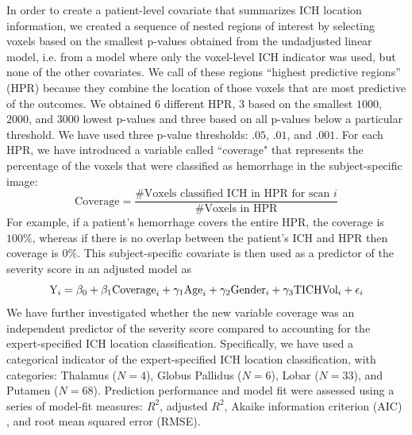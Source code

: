 \documentclass[10pt]{article}\usepackage[]{graphicx}\usepackage[]{color}
\begin{document}
In order to create a patient-level covariate that summarizes ICH location information, we created a sequence of nested regions of interest by selecting voxels based on the smallest p-values obtained from the undadjusted linear model, i.e. from a model where only the voxel-level ICH indicator was used, but none of the other covariates.  We call of these regions ``highest predictive regions'' (HPR) because they combine the location of those voxels that are most predictive of the outcomes. 
We obtained 6 different HPR, $3$ based on the smallest $1000$, $2000$, and $3000$ lowest p-values and three based on all p-values below a particular threshold. We have used three p-value thresholds: $.05$, $.01$, and $.001$. For each HPR, we have introduced a variable called ``coverage" that represents the percentage of the voxels that were classified as hemorrhage in the subject-specific image: 
\begin{equation}
\text{Coverage} = \frac{\text{\# Voxels classified ICH in HPR for scan } i}{\text{\# Voxels in HPR}}
\end{equation}
For example, if a patient's hemorrhage covers the entire HPR, the coverage is $100\%$, whereas if there is no overlap between the patient's ICH and HPR then coverage is 0\%.  This subject-specific covariate is then used as a predictor of the severity score in an adjusted model as
$$
{\rm Y}_i = \beta_0 + \beta_1 {\rm Coverage}_i + \gamma_1{\rm Age}_i  +\gamma_2{\rm Gender}_i +\gamma_3{\rm TICHVol}_i + \epsilon_{i}
$$
We have further investigated whether the new variable coverage was an independent predictor of the severity score compared to accounting for the expert-specified ICH location classification. Specifically, we have used 
a categorical indicator of the expert-specified ICH location classification, with categories: Thalamus ($N = 4$), Globus Pallidus ($N = 6$), Lobar ($N = 33$), and Putamen ($N = 68$).  
Prediction performance and model fit were assessed using a series of model-fit measures: $R^2$, adjusted $R^2$, Akaike information criterion (AIC) \citep{akaike_information_1973}, 
and root mean squared error (RMSE).  
\end{document}
